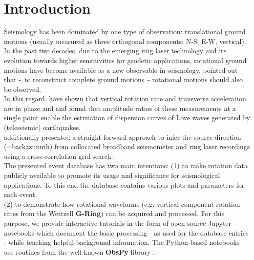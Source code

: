 \documentclass[12pt,reqno,letter]{article}
\begin{document}
\section*{Introduction}
Seismology has been dominated by one type of observation: translational ground motions (usually measured as three orthogonal components: N-S, E-W, vertical). In the past two decades, due to the emerging ring laser technology  and its evolution towards higher  sensitivities \citep{Stedman1997,Schreiber2013} for geodetic applications, rotational ground motions have become available as a new observable in seismology.
\cite{AkiRichards2002} pointed out that -~to reconstruct complete ground motions~- rotational motions should also be observed.
\\ 
In this regard, \cite{McLeod1998, Pancha2000} have shown that vertical rotation rate and transverse acceleration are in phase and \cite{Igel2005,Igel2007} and \cite{Kurrle2010} found that amplitude ratios of these measurements at a single point enable the estimation of dispersion curves of Love waves generated by (teleseismic) earthquakes.\\
\cite{Igel2007} additionally presented a straight-forward approach to infer the source direction (=backazimuth) from  collocated broadband seismometer and ring laser recordings using a cross-correlation grid search.\\

The presented event database has two main intentions:
(1) to make rotation data publicly available to promote its usage and significance for seismological applications. To this end the database contains various plots and parameters for each event.\\
(2) to demonstrate how rotational waveforms (e.g. vertical component rotation rates from the Wettzell \textbf{G-Ring}) can be acquired and processed. For this purpose, we provide interactive tutorials in the form of open source Jupyter notebooks \citep{Perez2007} which  document the basic processing - as used for the database entries - while teaching helpful background information. The Python-based notebooks use routines from the well-known \textbf{ObsPy} library \citep{Megies2011,Krischer2015}.
\end{document}
